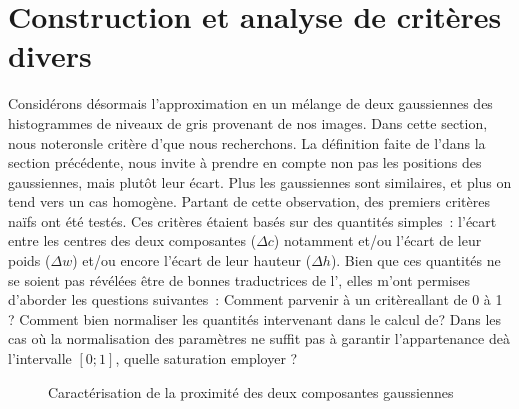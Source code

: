 \documentclass[main.tex]{subfiles}
\begin{document}
\section{Construction et analyse de critères divers}
Considérons désormais l'approximation en un mélange de deux gaussiennes des histogrammes de niveaux de gris provenant de nos images. Dans cette section, nous noterons\HH le critère d'\hetero que nous recherchons. 
La définition faite de l'\hetero dans la section précédente, nous invite à prendre en compte non pas les positions des gaussiennes, mais plutôt leur écart. Plus les gaussiennes sont similaires, et plus on tend vers un cas homogène. Partant de cette observation, 
des premiers critères naïfs ont été testés. Ces critères étaient basés sur des quantités simples~:  l'écart entre les centres des deux composantes ($\Delta c$) notamment et/ou l'écart de leur poids  ($\Delta w$) et/ou encore l'écart de leur hauteur ($\Delta h$). Bien que ces quantités ne se soient pas révélées être de bonnes traductrices de l'\hetero, elles m'ont permises d'aborder les questions suivantes~:
Comment parvenir à un critère\HH allant de 0 à 1 ? Comment bien normaliser les quantités intervenant dans le calcul de\HH ? Dans les cas où la normalisation des paramètres ne suffit pas à garantir l'appartenance de\HH à l'intervalle $[0;1]$, quelle saturation employer ? 

\begin{figure}
\centering
{} 
\caption{Caractérisation de la proximité des deux composantes gaussiennes}
\end{figure}
\end{document}
